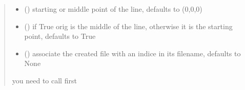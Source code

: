 \documentclass[letterpaper,10pt,english]{sphinxmanual}
\begin{document}
\begin{fulllineitems}
\begin{fulllineitems}
\begin{quote}
\begin{description}
\begin{itemize}
\item {} 
\sphinxAtStartPar
{} (\sphinxstyleliteralemphasis{\sphinxupquote{, }}) \textendash{} starting or middle point of the line, defaults to (0,0,0)

\item {} 
\sphinxAtStartPar
{} (\sphinxstyleliteralemphasis{\sphinxupquote{, }}) \textendash{} if True orig is the middle of the line, otherwise it is the starting point, defaults to True

\item {} 
\sphinxAtStartPar
{} (\sphinxstyleliteralemphasis{\sphinxupquote{, }}) \textendash{} associate the created file with an indice in its filename, defaults to None

\end{itemize}

\sphinxAtStartPar
{} \textendash{} you need to call {\hyperref[\detokenize{reference:LVM.LightVegeManager.run}]{}} first

\end{description}\end{quote}

\end{fulllineitems}


\begin{fulllineitems}
\label{\detokenize{reference:LVM.LightVegeManager.plantGL_sensors}}
\pysigstartsignatures
{}
\pysigstopsignatures
\end{fulllineitems}



\end{fulllineitems}
\end{document}
